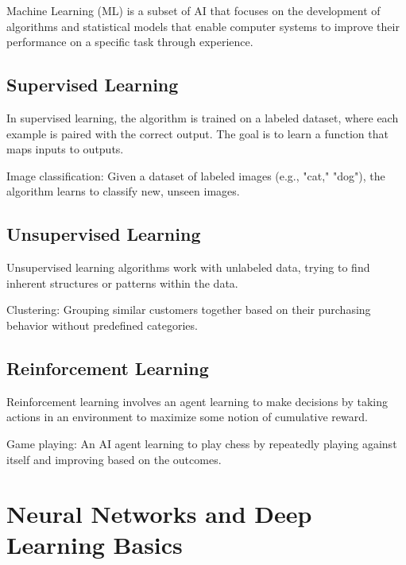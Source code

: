 Machine Learning (ML) is a subset of AI that focuses on the development
of algorithms and statistical models that enable computer systems to
improve their performance on a specific task through experience.

\subsection{Supervised Learning}

In supervised learning, the algorithm is trained on a labeled dataset,
where each example is paired with the correct output. The goal is to
learn a function that maps inputs to outputs.

\begin{example}
Image classification: Given a dataset of labeled images (e.g., "cat," "dog"), the algorithm learns to classify new, unseen images.
\end{example}

\subsection{Unsupervised Learning}

Unsupervised learning algorithms work with unlabeled data, trying to
find inherent structures or patterns within the data.

\begin{example}
Clustering: Grouping similar customers together based on their purchasing behavior without predefined categories.
\end{example}

\subsection{Reinforcement Learning}

Reinforcement learning involves an agent learning to make decisions by
taking actions in an environment to maximize some notion of cumulative
reward.

\begin{example}
Game playing: An AI agent learning to play chess by repeatedly playing against itself and improving based on the outcomes.
\end{example}

\section{Neural Networks and Deep Learning Basics}

